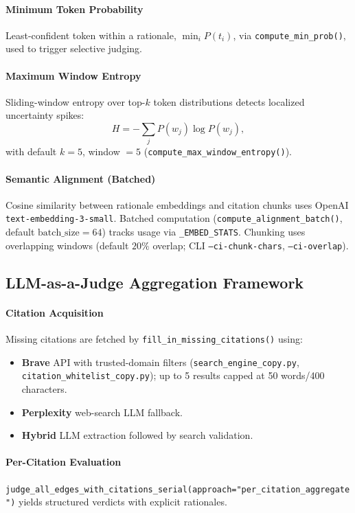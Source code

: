 \paragraph{Minimum Token Probability}
Least-confident token within a rationale, \(\min_i P(t_i)\), via \texttt{compute\_min\_prob()}, used to trigger selective judging.

\paragraph{Maximum Window Entropy}
Sliding-window entropy over top-\(k\) token distributions detects localized uncertainty spikes:
\[
H = -\sum_{j} P(w_j)\log P(w_j),
\]
with default \(k=5\), window \(=5\) (\texttt{compute\_max\_window\_entropy()}).

\paragraph{Semantic Alignment (Batched)}
Cosine similarity between rationale embeddings and citation chunks uses OpenAI \texttt{text-embedding-3-small}. Batched computation (\texttt{compute\_alignment\_batch()}, default \(\text{batch\_size}=64\)) tracks usage via \texttt{\_EMBED\_STATS}. Chunking uses overlapping windows (default \(20\%\) overlap; CLI \texttt{--ci-chunk-chars}, \texttt{--ci-overlap}).

\subsection{LLM-as-a-Judge Aggregation Framework}

\paragraph{Citation Acquisition}
Missing citations are fetched by \texttt{fill\_in\_missing\_citations()} using:
\begin{itemize}
  \item \textbf{Brave} API with trusted-domain filters (\texttt{search\_engine\_copy.py}, \texttt{citation\_whitelist\_copy.py}); up to 5 results capped at 50 words/400 characters.
  \item \textbf{Perplexity} web-search LLM fallback.
  \item \textbf{Hybrid} LLM extraction followed by search validation.
\end{itemize}

\paragraph{Per-Citation Evaluation}
\texttt{judge\_all\_edges\_with\_citations\_serial(approach="per\_citation\_aggregate")} yields structured verdicts with explicit rationales.

